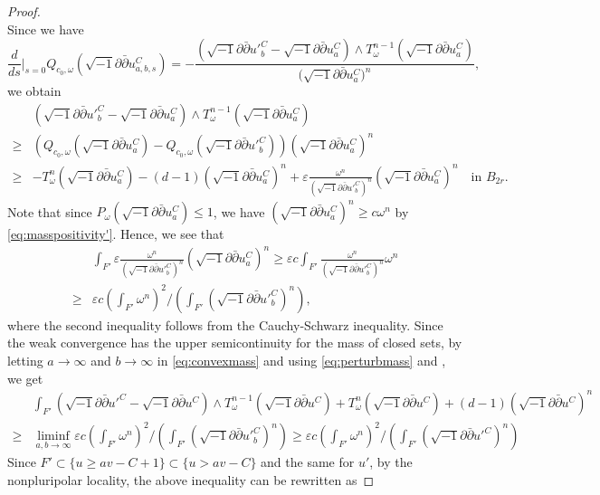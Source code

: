 \documentclass[10pt,a4paper]{amsart}
\numberwithin{equation}{section}
\newcommand{\delb}{\sqrt{-1}\partial\bar{\partial}}
\begin{document}
\begin{proof}
\begin{equation*}
    \end{equation*}
    Since we have
    $$\frac{d}{ds}\Bigg\vert_{s=0} Q_{c_0,\omega}(\delb u^C_{a,b,s})=-\frac{(\delb u'^C_b-\delb u^C_a)\wedge T^{n-1}_\omega(\delb u^C_a)}{\big(\delb u^C_a\big)^n},$$
    we obtain
    \begin{equation}\label{eq:convexmass}
        \begin{aligned}
            &\left(\delb u'^C_b-\delb u^C_a\right)\wedge T^{n-1}_\omega(\delb u^C_a)\\
            \ge &\left(Q_{c_0,\omega}(\delb u^C_a)-Q_{c_0,\omega}(\delb u'^C_b)\right)(\delb u^C_a)^n \\ 
            \ge&-T^n_\omega(\delb u^C_a)-(d-1)(\delb u^C_a)^n+\varepsilon\frac{\omega^n}{(\delb u'^C_b)^n}(\delb u^C_a)^n\quad \text{in $B_{2r}$}.
        \end{aligned}
    \end{equation}
    Note that since $P_\omega(\delb u^C_a)\le1$, we have $(\delb u^C_a)^n\ge c\omega^n$ by \eqref{eq:masspositivity'}. 
    Hence, we see that 
    \begin{equation}\label{eq:perturbmass}
        \begin{aligned}
            &\int_{F'}\varepsilon\frac{\omega^n}{(\delb u'^C_b)^n}(\delb u^C_a)^n
        \ge\varepsilon c \int_{F'}\frac{\omega^n}{(\delb u'^C_b)^n}\omega^n\\
        \ge&\varepsilon c \left(\int_{F'}\omega^n\right)^2\Bigg/\left(\int_{F'}(\delb u'^C_b)^n\right),
        \end{aligned}
    \end{equation}
    where the second inequality follows from the Cauchy-Schwarz inequality. Since the weak convergence has the upper semicontinuity for the mass of closed sets, by letting $a\to\infty$ and $b\to\infty$ in \eqref{eq:convexmass} and using \eqref{eq:perturbmass} and \cite[Theorem 2.1]{BT}, we get
    \begin{equation*}
        \begin{aligned}
            &\int_{F'}\left(\delb u'^C-\delb u^C\right)\wedge T^{n-1}_\omega(\delb u^C)+T^n_\omega(\delb u^C)+(d-1)(\delb u^C)^n\\
            \ge&\liminf_{a,b\to\infty}\varepsilon c \left(\int_{F'}\omega^n\right)^2\Bigg/\left(\int_{F'}(\delb u'^C_b)^n\right)\ge\varepsilon c \left(\int_{F'}\omega^n\right)^2\Bigg/\left(\int_{F'}(\delb u'^C)^n\right)
        \end{aligned}
    \end{equation*}
    Since $F'\subset\{u\ge av-C+1\}\subset \{u>av-C\}$ and the same for $u'$, by the nonpluripolar locality, the above inequality can be rewritten as 

\end{proof}
\end{document}
